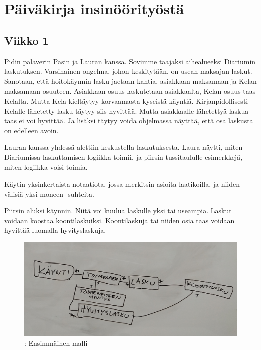 \vspace{21.5pt}

\hypertarget{puxe4ivuxe4kirja-insinuxf6uxf6rityuxf6stuxe4}{%
\chapter{Päiväkirja
insinöörityöstä}\label{puxe4ivuxe4kirja-insinuxf6uxf6rityuxf6stuxe4}}

\hypertarget{viikko-1}{%
\section{Viikko 1}\label{viikko-1}}

Pidin palaverin Pasin ja Lauran kanssa. Sovimme taajaksi aihealueeksi
Diariumin laskutuksen. Varsinainen ongelma, johon keskitytään, on usean
maksajan laskut. Sanotaan, että hoitokäynnin lasku jaetaan kahtia,
asiakkaan maksamaan ja Kelan maksamaan osuuteen. Asiakkaan osuus
laskutetaan asiakkaalta, Kelan osuus taas Kelalta. Mutta Kela kieltäytyy
korvaamasta kyseistä käyntiä. Kirjanpidollisesti Kelalle lähetetty lasku
täytyy siis hyvittää. Mutta asiakkaalle lähetettyä laskua taas ei voi
hyvittää. Ja lisäksi täytyy voida ohjelmassa näyttää, että osa laskusta
on edelleen avoin.

Lauran kanssa yhdessä alettiin keskustella laskutuksesta. Laura näytti,
miten Diariumissa laskuttamisen logiikka toimii, ja piirsin
tussitaululle esimerkkejä, miten logiikka voisi toimia.

Käytin yksinkertaista notaatiota, jossa merkitsin asioita laatikoilla,
ja niiden välisiä yksi moneen -suhteita.

Piirsin aluksi käynnin. Niitä voi kuulua laskulle yksi tai useampia.
Laskut voidaan koostaa koontilaskuiksi. Koontilaskuja tai niiden osia
taas voidaan hyvittää luomalla hyvityslaskuja.

\begin{figure}
\centering
\includegraphics[width=\textwidth,height=0.3\textheight]{illustration/malli1.jpg}
\caption{\label{malli1}: Ensimmäinen malli}
\end{figure}

